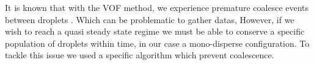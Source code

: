 It is known that with the VOF method, we experience premature coalesce events between droplets \citet[Appendix B]{innocenti2020direct}.
Which can be problematic to gather datas,\citet{loisy2017buoyancy}
However, if we wish to reach a quasi steady state regime we must be able to conserve a specific population of droplets within time, in our case a mono-disperse configuration. 
To tackle this issue we used a specific algorithm which prevent coalescence. 


